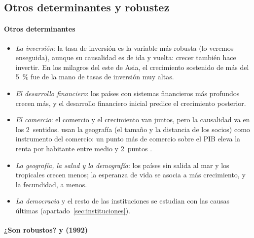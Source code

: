 \documentclass[11pt]{article}
\begin{document}
\subsection{Otros determinantes y robustez}\label{sec:robustez}

\paragraph{Otros determinantes}

\begin{itemize}
\item \emph{La inversión}: la tasa de inversión es la variable más robusta (lo veremos enseguida), aunque su causalidad es de ida y vuelta: crecer también hace invertir. En los milagros del este de Asia, el crecimiento sostenido de más del 5~\% fue de la mano de tasas de inversión muy altas.
\item \emph{El desarrollo financiero}: los países con sistemas financieros más profundos crecen más, y el desarrollo financiero inicial predice el crecimiento posterior\nocite{KingLevine1993}.
\item \emph{El comercio}: el comercio y el crecimiento van juntos, pero la causalidad va en los 2~sentidos. \textcite{FrankelRomer1999} usan la geografía (el tamaño y la distancia de los socios) como instrumento del comercio: un punto más de comercio sobre el PIB eleva la renta por habitante entre medio y 2~puntos .
\item \emph{La geografía, la salud y la demografía}: los países sin salida al mar y los tropicales crecen menos; la esperanza de vida se asocia a más crecimiento, y la fecundidad, a menos\nocite{Barro1997Determinants}.
\item \emph{La democracia} y el resto de las instituciones se estudian con las causas últimas (apartado~\ref{sec:instituciones}).
\end{itemize}

\paragraph{¿Son robustos?  y  (1992)}
\end{document}
